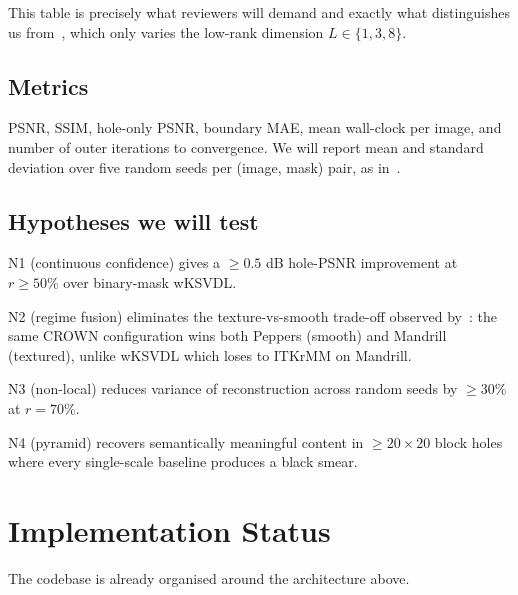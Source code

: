 \documentclass[11pt,a4paper]{article}
\theoremstyle{definition}
\theoremstyle{remark}
\begin{document}
This table is precisely what reviewers will demand and exactly what
distinguishes us from~\cite{tiefenthaler2018thesis}, which only varies
the low-rank dimension $L\in\{1,3,8\}$.

\subsection{Metrics}
PSNR, SSIM, hole-only PSNR, boundary MAE, mean wall-clock per image,
and number of outer iterations to convergence. We will report mean and
standard deviation over five random seeds per (image, mask) pair, as
in~\cite{tiefenthaler2018thesis}.

\subsection{Hypotheses we will test}

\begin{description}[leftmargin=2.4em,itemsep=2pt]
\item[H1.] N1 (continuous confidence) gives a $\ge 0.5$ dB
  hole-PSNR improvement at $r\ge 50\%$ over binary-mask wKSVDL.
\item[H2.] N2 (regime fusion) eliminates the texture-vs-smooth
  trade-off observed by~\cite{tiefenthaler2018thesis}: the same
  CROWN configuration wins both Peppers (smooth) and Mandrill
  (textured), unlike wKSVDL which loses to ITKrMM on Mandrill.
\item[H3.] N3 (non-local) reduces variance of reconstruction across
  random seeds by $\ge 30\%$ at $r=70\%$.
\item[H4.] N4 (pyramid) recovers semantically meaningful content in
  $\ge 20\times 20$ block holes where every single-scale baseline
  produces a black smear.
\end{description}

\section{Implementation Status}

The codebase is already organised around the architecture above.
\end{document}
